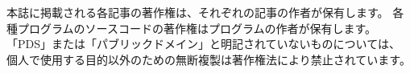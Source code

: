 {本誌に掲載される各記事の著作権は、それぞれの記事の作者が保有します。
各種プログラムのソースコードの著作権はプログラムの作者が保有します。
「PDS」または「パブリックドメイン」と明記されていないものについては、
個人で使用する目的以外のための無断複製は著作権法により禁止されています。
}

